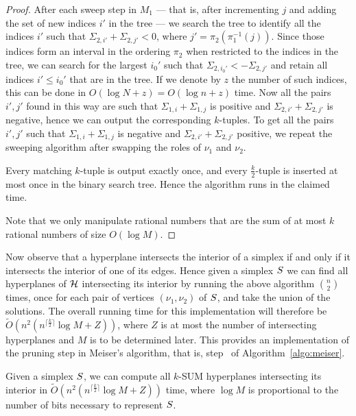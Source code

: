 \begin{proof}
	After each sweep step in $M_1$ --- that is, after incrementing $j$ and
	adding the set of new indices $i'$ in the tree --- we search the tree to
	identify all the indices $i'$ such that $\Sigma_{2,i'} + \Sigma_{2,j'} <
	0$, where $j' = \pi_2(\pi_1^{-1}(j))$. Since those indices form an interval
	in the ordering $\pi_2$ when restricted to the indices in the tree, we can
	search for the largest $i_0'$ such that $\Sigma_{2,i_0'} < -\Sigma_{2,j'}$
	and retain all indices $i' \le i_0'$ that are in the tree. If we denote by
	$z$ the number of such indices, this can be done in $O(\log N + z) = O(\log
	n + z)$ time. Now all the pairs $i', j'$ found in this way are such that
	$\Sigma_{1,i} + \Sigma_{1,j}$ is positive and $\Sigma_{2,i'} +
	\Sigma_{2,j'}$ is negative, hence we can output the corresponding
	$k$-tuples. To get all the pairs $i', j'$ such that
	$\Sigma_{1,i} + \Sigma_{1,j}$ is negative and $\Sigma_{2,i'} +
	\Sigma_{2,j'}$ positive, we repeat the sweeping algorithm after swapping the
	roles of $\nu_1$ and $\nu_2$.

	Every matching $k$-tuple is output exactly once, and every
	$\frac{k}{2}$-tuple is inserted at most once in the binary search tree.
	Hence the algorithm runs in the claimed time.

	Note that we only manipulate rational numbers that are the sum of at most
	$k$ rational numbers of size $O(\log M)$.
\end{proof}

Now observe that a hyperplane intersects the interior of a simplex if and only
if it intersects the interior of one of its edges. Hence given a simplex
$S$ we can find all hyperplanes of $\mathcal{H}$ intersecting its interior by
running the above algorithm ${n\choose 2}$ times, once for each pair of
vertices $(\nu_1,\nu_2)$ of $S$, and take the union of the solutions.
The overall running time for this implementation will therefore be
$\tilde{O}(n^2 (n^{\lceil \frac k2 \rceil} \log M + Z))$, where $Z$ is at most the
number of intersecting hyperplanes and $M$ is to be determined later.
This provides an implementation of the pruning step in Meiser's algorithm, that
is, step~ of Algorithm~\ref{algo:meiser}.

\begin{corollary}\label{cor:double}
	Given a simplex $S$, we can compute all $k$-SUM hyperplanes
	intersecting its interior in $\tilde{O}(n^2 (n^{\lceil \frac k2 \rceil}
	\log M + Z))$ time, where $\log M$ is proportional to the number of bits
	necessary to represent $S$.
\end{corollary}

